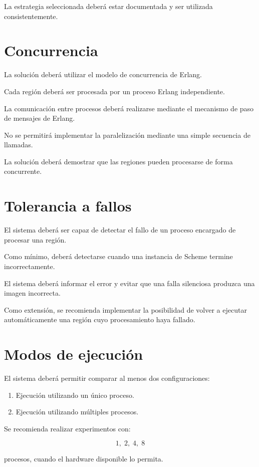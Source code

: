 \documentclass[11pt,a4paper]{article}
\begin{document}
La estrategia seleccionada deberá estar documentada y ser utilizada
consistentemente.

\section{Concurrencia}

La solución deberá utilizar el modelo de concurrencia de Erlang.

Cada región deberá ser procesada por un proceso Erlang independiente.

La comunicación entre procesos deberá realizarse mediante el mecanismo
de paso de mensajes de Erlang.

No se permitirá implementar la paralelización mediante una simple
secuencia de llamadas.

La solución deberá demostrar que las regiones pueden procesarse de
forma concurrente.

\section{Tolerancia a fallos}

El sistema deberá ser capaz de detectar el fallo de un proceso
encargado de procesar una región.

Como mínimo, deberá detectarse cuando una instancia de Scheme termine
incorrectamente.

El sistema deberá informar el error y evitar que una falla silenciosa
produzca una imagen incorrecta.

Como extensión, se recomienda implementar la posibilidad de volver a
ejecutar automáticamente una región cuyo procesamiento haya fallado.

\section{Modos de ejecución}

El sistema deberá permitir comparar al menos dos configuraciones:

\begin{enumerate}
\item Ejecución utilizando un único proceso.
\item Ejecución utilizando múltiples procesos.
\end{enumerate}

Se recomienda realizar experimentos con:

$$
1,\;2,\;4,\;8
$$

procesos, cuando el hardware disponible lo permita.
\end{document}
